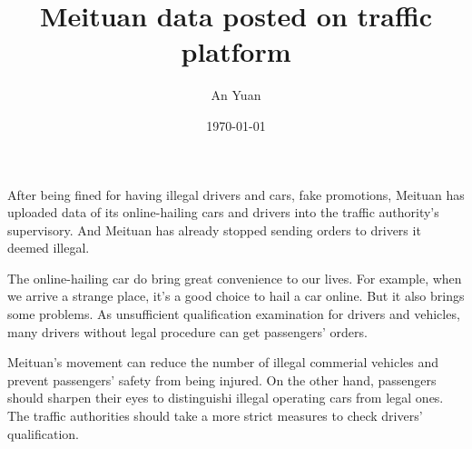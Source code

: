 \documentclass[a4paper,12pt]{article}
\begin{document}
	\title{Meituan data posted on traffic platform}
	\author{An Yuan}
	\date{\today}
	\maketitle
	\paragraph{}
	After being fined for having illegal drivers and cars, fake promotions, Meituan has uploaded data of its online-hailing cars and drivers into the traffic authority's supervisory.  And Meituan has already stopped sending orders to drivers it deemed illegal.
	\par
	The online-hailing car do bring great convenience to our lives. For example, when we arrive a strange place, it's a good choice to hail a car online. But it also brings some problems. As unsufficient qualification examination for drivers and vehicles, many drivers without legal procedure can get passengers' orders.
	\par
	Meituan's movement can reduce the number of illegal commerial vehicles and prevent passengers' safety from being injured. On the other hand, passengers should sharpen their eyes to distinguishi illegal operating cars from legal ones. The traffic authorities should take a more strict measures to check drivers' qualification. 
\end{document}
